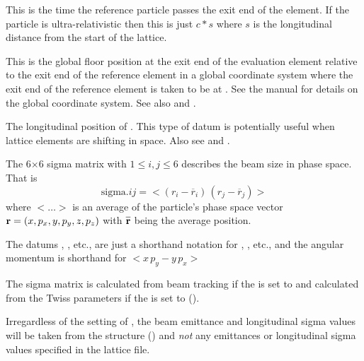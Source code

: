 \begin{description}
{  %
  \item[ref_time] \Newline {}
This is the time the reference particle passes the exit end of the element.  If the particle is
ultra-relativistic then this is just $c * s$ where $s$ is the longitudinal distance from the start
of the lattice.

  \item[rel_floor.x, .y, .z, .theta] \Newline {}
This is the global floor position at the exit end of the evaluation element relative to the exit end
of the reference element in a global coordinate system where the exit end of the reference element
is taken to be at . See the \bmad manual for details on the global
coordinate system. See also  and .

  \item[s_position] \Newline {}
The longitudinal position of . This type of datum is potentially useful when lattice elements are shifting in space.
Also see  and .

  \item[sigma.x, .y, .z, .px, .py, .pz, .Lxy, .$ij$ \hspace{0.02in} $1 \le i,j \le 6$] \Newline {}
The 6$\times$6 sigma matrix  with $1 \le i,j \le 6$ describes the beam size in phase
space. That is
\begin{equation}
  \text{sigma.}ij = \big< (r_i - \overline r_i) \, (r_j - \overline r_j) \big>
\end{equation}
where $< \ldots >$ is an average of the particle's phase space vector ${\bf r} = (x, p_x, y, p_y, z, p_z)$ 
with $\overline{\mbox\bfr\raisebox{1.9mm}{}}$ being the average position. 

The datums , , etc., are just a shorthand notation for ,
, etc., and the angular momentum  is shorthand for $<x \, p_y - y \, p_x>$ 

The sigma matrix is calculated from beam tracking if the  is set to  and
calculated from the Twiss parameters if the  is set to  (). 

Irregardless of the setting of , the beam emittance and longitudinal sigma
values will be taken from the  structure () and {\em not}
any emittances or longitudinal sigma values specified in the lattice file.

}
\end{description}
